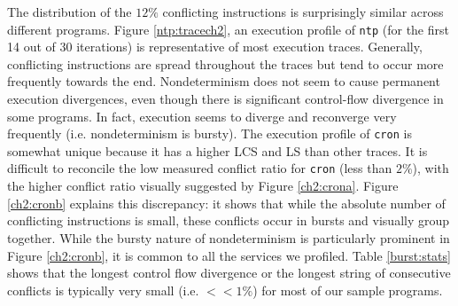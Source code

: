 The distribution of the $12\%$ conflicting instructions
is surprisingly similar across different programs.
Figure \ref{ntp:tracech2}, an execution profile of \texttt{ntp}
(for the first 14 out of 30 iterations) is representative
of most execution traces. Generally,
conflicting instructions are spread throughout
the traces but tend to occur more frequently
towards the end. Nondeterminism does not seem to cause permanent 
execution divergences, even though there is significant
control-flow divergence in some programs. In fact, execution seems to
diverge and reconverge very frequently (i.e. nondeterminism is bursty).
The execution profile of \texttt{cron} is somewhat unique
because it has a higher LCS and LS than other traces. It is
difficult to reconcile the low measured conflict ratio for \texttt{cron} (less
than $2\%$), with the higher conflict ratio visually suggested by 
Figure \ref{ch2:crona}. Figure \ref{ch2:cronb} 
explains this discrepancy: it shows that while
the absolute number of conflicting instructions is small,
these conflicts occur in bursts and visually group together. 
While the bursty nature of nondeterminism
is particularly prominent in Figure \ref{ch2:cronb},
it is common to all the services we profiled. Table \ref{burst:stats}
shows that the longest control flow divergence 
or the longest string of consecutive conflicts
is typically very small (i.e. $<<1\%$) 
for most of our sample programs.

